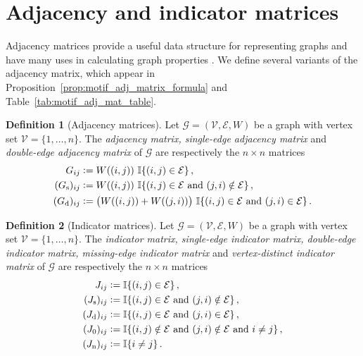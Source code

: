 \documentclass[12pt,draft]{ociamthesis}
\theoremstyle{plain}
\theoremstyle{definition}
\newtheorem{definition}{Definition}[chapter]
\theoremstyle{remark}
\newcommand\bb[1]{\mathbb{#1}}
\newcommand\ca[1]{\mathcal{#1}}
\begin{document}
\section{Adjacency and indicator matrices}
\label{sec:graphs_adj_and_ind_matrices}

Adjacency matrices provide a useful data structure for representing graphs and
have many uses in calculating graph properties \cite{bapat2010graphs}.  We
define several variants of the adjacency matrix, which appear in
Proposition~\ref{prop:motif_adj_matrix_formula} and
Table~\ref{tab:motif_adj_mat_table}.

\begin{definition}[Adjacency matrices]
  Let $\ca{G} = (\ca{V,E},W)$ be a graph with vertex set $\ca{V} = \{1, \ldots,
  n \}$. The \emph{adjacency matrix, single-edge adjacency matrix} and
  \emph{double-edge adjacency matrix} of $\ca{G}$ are respectively the $n
  \times n$ matrices
  \begin{align*}
    G_{i j} &\vcentcolon= W((i,j)) \ \bb{I} \{ (i,j) \in \ca{E} \}\,, \\
    (G_\mathrm{s})_{i j} &\vcentcolon= W((i,j)) \ \bb{I} \{ (i,j) \in \ca{E}
    \textrm{ and } (j,i) \notin \ca{E} \}\,, \\
    (G_\mathrm{d})_{i j} &\vcentcolon= \big( W((i,j)) + W((j,i)) \big) \ \bb{I}
    \{ (i,j) \in \ca{E} \textrm{ and } (j,i) \in \ca{E} \}\,.
  \end{align*}
\end{definition}

\begin{definition}[Indicator matrices]
  Let $\ca{G} = (\ca{V,E},W)$ be a graph with vertex set $\ca{V} = \{1, \ldots,
  n \}$. The \emph{indicator matrix, single-edge indicator matrix, double-edge
  indicator matrix, missing-edge indicator matrix} and \emph{vertex-distinct
  indicator matrix} of $\ca{G}$ are respectively the $n \times n$ matrices
  \begin{align*}
    J_{i j} &\vcentcolon= \bb{I} \{ (i,j) \in \ca{E} \}\,, \\
    (J_\mathrm{s})_{i j} &\vcentcolon= \bb{I} \{ (i,j) \in \ca{E} \textrm{ and }
    (j,i) \notin \ca{E} \}\,, \\
    (J_\mathrm{d})_{i j} &\vcentcolon= \bb{I} \{ (i,j) \in \ca{E} \textrm{ and }
    (j,i) \in \ca{E} \}\,, \\
    (J_0)_{i j} &\vcentcolon= \bb{I} \{ (i,j) \notin \ca{E} \textrm{ and } (j,i)
    \notin \ca{E} \textrm{ and } i \neq j \}\,, \\
    (J_\mathrm{n})_{i j} &\vcentcolon= \bb{I} \{ i \neq j \}\,.
  \end{align*}
\end{definition}
\end{document}
